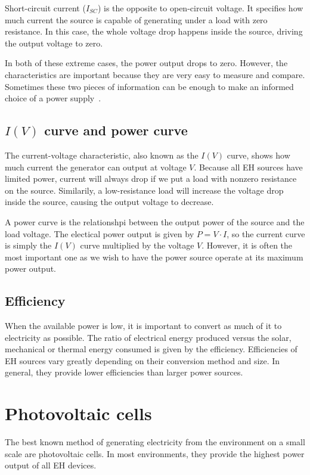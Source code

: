 \documentclass[a4paper,10pt]{article}
\begin{document}
Short-circuit current ($I_{SC}$) is the opposite to open-circuit voltage. It specifies how much current the source is capable of generating under a load with zero resistance. In this case, the whole voltage drop happens inside the source, driving the output voltage to zero. 

In both of these extreme cases, the power output drops to zero. However, the characteristics are important because they are very easy to measure and compare. Sometimes these two pieces of information can be enough to make an informed choice of a power supply~\cite{Salerno10}. 

\subsection{$I(V)$ curve and power curve}

The current-voltage characteristic, also known as the $I(V)$ curve, shows how much current the generator can output at voltage $V$. Because all \ac{EH} sources have limited power, current will always drop if we put a load with nonzero resistance on the source. Similarily, a low-resistance load will increase the voltage drop inside the source, causing the output voltage to decrease. 

A power curve is the relationshpi between the output power of the source and the load voltage. The electical power output is given by $P = V \cdot I$, so the current curve is simply the $I(V)$ curve multiplied by the voltage $V$. However, it is often the most important one as we wish to have the power source operate at its maximum power output. 

\subsection{Efficiency}

When the available power is low, it is important to convert as much of it to electricity as possible. The ratio of electrical energy produced versus the solar, mechanical or thermal energy consumed is given by the efficiency. Efficiencies of \ac{EH} sources vary greatly depending on their conversion method and size. In general, they provide lower efficiencies than larger power sources. 

\section{Photovoltaic cells}

The best known method of generating electricity from the environment on a small scale are photovoltaic cells. In most environments, they provide the highest power output of all \ac{EH} devices. 
\end{document}
